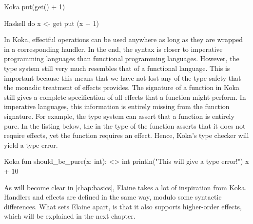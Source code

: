\begin{lst}{Koka}
put(get() + 1)
\end{lst}
\begin{lst}{Haskell}
do
  x <- get
  put (x + 1)
\end{lst}
%
In Koka, effectful operations can be used anywhere as long as they are wrapped in a corresponding handler. In the end, the syntax is closer to imperative programming languages than functional programming languages. However, the type system still very much resembles that of a functional language. This is important because this means that we have not lost any of the type safety that the monadic treatment of effects provides. The signature of a function in Koka still gives a complete specification of all effects that a function might perform. In imperative languages, this information is entirely missing from the function signature. For example, the type system can assert that a function is entirely pure. In the listing below, the \hs{<>} in the type of the function asserts that it does not require effects, yet the  function requires an effect. Hence, Koka's type checker will yield a type error.

\begin{lst}{Koka}
fun should_be_pure(x: int): <> int
  println("This will give a type error!")
  x + 10
\end{lst}
%
As will become clear in \cref{chap:basics}, Elaine takes a lot of inspiration from Koka. Handlers and effects are defined in the same way, modulo some syntactic differences. What sets Elaine apart, is that it also supports higher-order effects, which will be explained in the next chapter.
